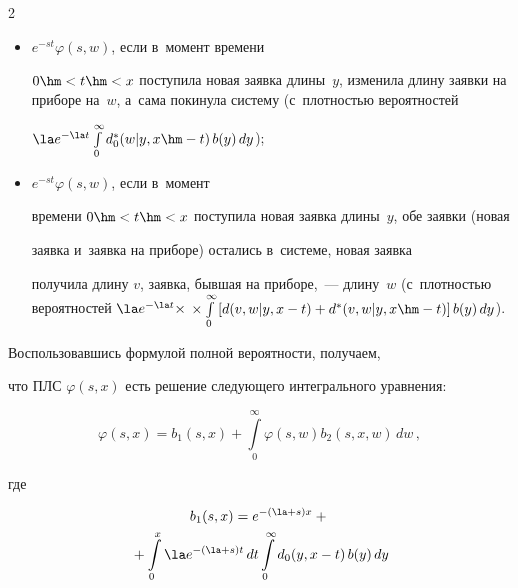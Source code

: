 \begin{multicols}{2}
\begin{itemize}
$\la e^{-\la t} \int\limits_0^\infty d_0(v|y,x\hm-t)\, b(y)\, dy


$);





\item  $e^{-s t}\varphi(s,w)$, если в~момент времени


$0\hm<t\hm<x$ поступила новая заявка длины~$y$, изменила длину заявки на приборе на~$w$, а~сама покинула систему (с~плот\-ностью вероятностей


$\la e^{-\la t} \int\limits_0^\infty d^*_0(w|y,x\hm-t)\, b(y)\, dy


$);





\item  $e^{-s t}\varphi(s,w)$, если в~момент


времени $0\hm<t\hm<x$ поступила новая заявка длины~$y$, обе заявки (новая


заявка и~заявка на приборе) остались в~системе, новая заявка


получила длину $v$, заявка, бывшая на приборе,~--- длину~$w$ (с~плот\-ностью вероятностей $\la e^{-\la t} \times$ $\times\int\limits_0^\infty


\left[d(v,w|y,x-t)+d^*(v,w|y,x\hm-t)\right] b(y)\, dy $).


\end{itemize}





Воспользовавшись формулой полной вероят\-ности, получаем,


что ПЛС $\varphi(s,x)$ есть решение следующего интегрального уравнения:


\begin{equation}


\label{eq2}


\varphi(s,x)=


b_1(s,x)+\int\limits_0^\infty \varphi(s,w)b_2(s,x,w) \, dw\,,


\end{equation}


где


\begin{multline*}


b_1(s,x) = e^{-(\la+s) x}+{}\\


{}+\int\limits_0^x \la e^{-(\la+s) t}\,dt


\int\limits_0^\infty d_0(y,x-t)\,b(y)\,dy



\end{multline*}
\end{multicols}
